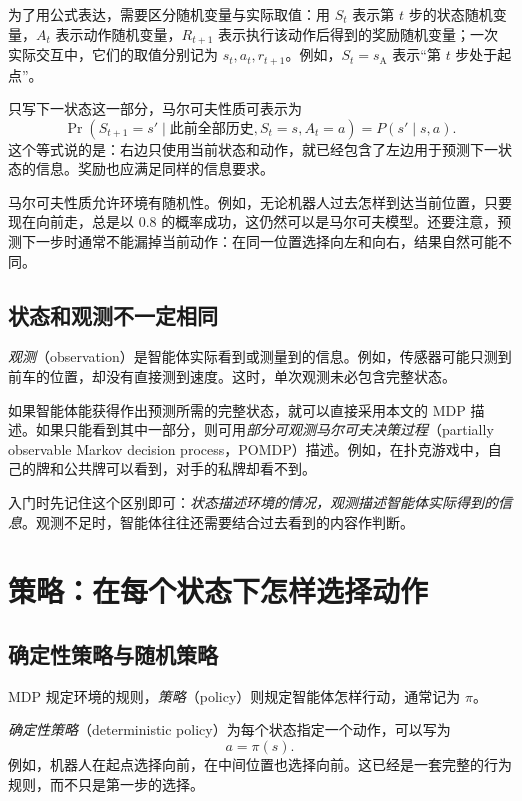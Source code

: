 \documentclass[UTF8,12pt,a4paper,fontset=fandol]{ctexart}
\begin{document}
为了用公式表达，需要区分随机变量与实际取值：用 $S_t$ 表示第 $t$ 步的状态随机变量，$A_t$ 表示动作随机变量，$R_{t+1}$ 表示执行该动作后得到的奖励随机变量；一次实际交互中，它们的取值分别记为 $s_t,a_t,r_{t+1}$。例如，$S_t=s_{\mathrm A}$ 表示“第 $t$ 步处于起点”。

只写下一状态这一部分，马尔可夫性质可表示为
\begin{equation}
  \Pr(S_{t+1}=s'\mid \text{此前全部历史},S_t=s,A_t=a)
  =P(s'\mid s,a).
  \label{eq:mdp-markov}
\end{equation}
这个等式说的是：右边只使用当前状态和动作，就已经包含了左边用于预测下一状态的信息。奖励也应满足同样的信息要求。

马尔可夫性质允许环境有随机性。例如，无论机器人过去怎样到达当前位置，只要现在向前走，总是以 $0.8$ 的概率成功，这仍然可以是马尔可夫模型。还要注意，预测下一步时通常不能漏掉当前动作：在同一位置选择向左和向右，结果自然可能不同。

\subsection{状态和观测不一定相同}

\emph{观测}（observation）是智能体实际看到或测量到的信息。例如，传感器可能只测到前车的位置，却没有直接测到速度。这时，单次观测未必包含完整状态。

如果智能体能获得作出预测所需的完整状态，就可以直接采用本文的 MDP 描述。如果只能看到其中一部分，则可用\emph{部分可观测马尔可夫决策过程}（partially observable Markov decision process，POMDP）描述。例如，在扑克游戏中，自己的牌和公共牌可以看到，对手的私牌却看不到。

入门时先记住这个区别即可：\emph{状态描述环境的情况，观测描述智能体实际得到的信息}。观测不足时，智能体往往还需要结合过去看到的内容作判断。

\section{策略：在每个状态下怎样选择动作}
\label{sec:mdp-policy}

\subsection{确定性策略与随机策略}

MDP 规定环境的规则，\emph{策略}（policy）则规定智能体怎样行动，通常记为 $\pi$。

\emph{确定性策略}（deterministic policy）为每个状态指定一个动作，可以写为
\[
  a=\pi(s).
\]
例如，机器人在起点选择向前，在中间位置也选择向前。这已经是一套完整的行为规则，而不只是第一步的选择。
\end{document}
